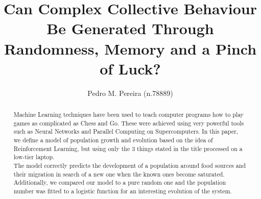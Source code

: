 \documentclass[a4paper,prd,twocolumn,nofootinbib,superscriptaddress,floatfix]{revtex4}
\begin{document}

\title{Can Complex Collective Behaviour Be Generated Through Randomness, Memory and a Pinch of Luck?}

\author{Pedro M. Pereira (n.78889)}


\begin{abstract}
Machine Learning techniques have been used to teach computer programs how to play games as complicated as Chess and Go. These were achieved using very powerful tools such as Neural Networks and Parallel Computing on Supercomputers. In this paper, we define a model of population growth and evolution based on the idea of Reinforcement Learning, but using only the 3 things stated in the title processed on a low-tier laptop.\\
The model correctly predicts the development of a population around food sources and their migration in search of a new one when the known ones become saturated. Additionally, we compared our model to a pure random one and the population number was fitted to a logistic function for an interesting evolution of the system.
\end{abstract}

\maketitle
\end{document}
